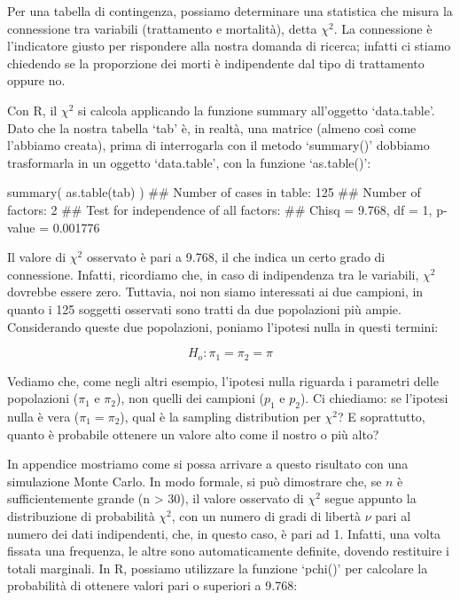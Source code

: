 \documentclass[a4paper,12pt,oneside]{book}
\newenvironment{Shaded}{}{}
\newcommand{\KeywordTok}[1]{#1}
\newcommand{\CommentTok}[1]{#1}
\newcommand{\NormalTok}[1]{#1}
\begin{document}
Per una tabella di contingenza, possiamo determinare una statistica che misura la connessione tra variabili (trattamento e mortalità), detta \(\chi^2\). La connessione è l'indicatore giusto per rispondere alla nostra domanda di ricerca; infatti ci stiamo chiedendo se la proporzione dei morti è indipendente dal tipo di trattamento oppure no.

Con R, il \(\chi^2\) si calcola applicando la funzione summary all'oggetto `data.table'. Dato che la nostra tabella `tab' è, in realtà, una matrice (almeno così come l'abbiamo creata), prima di interrogarla con il metodo `summary()' dobbiamo trasformarla in un oggetto `data.table', con la funzione `as.table()':

\begin{Shaded}
\begin{Highlighting}[]
\KeywordTok{summary}\NormalTok{( }\KeywordTok{as.table}\NormalTok{(tab) )}
\CommentTok{## Number of cases in table: 125 }
\CommentTok{## Number of factors: 2 }
\CommentTok{## Test for independence of all factors:}
\CommentTok{##  Chisq = 9.768, df = 1, p-value = 0.001776}
\end{Highlighting}
\end{Shaded}

Il valore di \(\chi^2\) osservato è pari a 9.768, il che indica un certo grado di connessione. Infatti, ricordiamo che, in caso di indipendenza tra le variabili, \(\chi^2\) dovrebbe essere zero. Tuttavia, noi non siamo interessati ai due campioni, in quanto i 125 soggetti osservati sono tratti da due popolazioni più ampie. Considerando queste due popolazioni, poniamo l'ipotesi nulla in questi termini:

\[H_o :\pi_1  = \pi_2  = \pi\]

Vediamo che, come negli altri esempio, l'ipotesi nulla riguarda i parametri delle popolazioni (\(\pi_1\) e \(\pi_2\)), non quelli dei campioni (\(p_1\) e \(p_2\)). Ci chiediamo: se l'ipotesi nulla è vera (\(\pi_1 = \pi_2\)), qual è la sampling distribution per \(\chi^2\)? E soprattutto, quanto è probabile ottenere un valore alto come il nostro o più alto?

In appendice mostriamo come si possa arrivare a questo risultato con una simulazione Monte Carlo. In modo formale, si può dimostrare che, se \(n\) è sufficientemente grande (n \textgreater{} 30), il valore osservato di \(\chi^2\) segue appunto la distribuzione di probabilità \(\chi^2\), con un numero di gradi di libertà \(\nu\) pari al numero dei dati indipendenti, che, in questo caso, è pari ad 1. Infatti, una volta fissata una frequenza, le altre sono automaticamente definite, dovendo restituire i totali marginali. In R, possiamo utilizzare la funzione `pchi()' per calcolare la probabilità di ottenere valori pari o superiori a 9.768:
\end{document}
